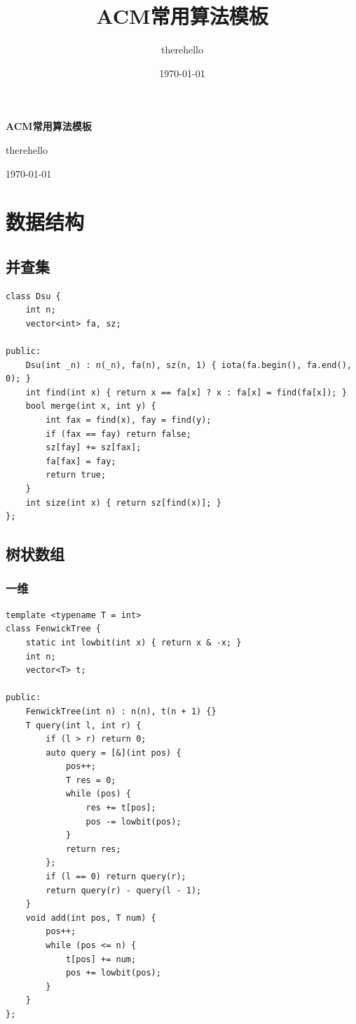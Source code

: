 \documentclass[UTF8, twoside]{ctexart}
\title{ACM常用算法模板}
\author{therehello}
\date{\today}
\newcommand\blankpage{
    \null
    \thispagestyle{empty}
    \addtocounter{page}{-1}
    \newpage
}
\begin{document}
\begin{sloppypar}

\begin{titlepage}
    \centering
    {\fontsize{40pt}{0pt}\selectfont \textbf{ACM常用算法模板}\par} %
    \vfill %
    {\fontsize{12pt}{0pt}\selectfont therehello\par} %
    \today %
\end{titlepage}

\blankpage

\tableofcontents

\clearpage

\section{数据结构}

\subsection{并查集}

\begin{lstlisting}[style=cpp]
class Dsu {
    int n;
    vector<int> fa, sz;

public:
    Dsu(int _n) : n(_n), fa(n), sz(n, 1) { iota(fa.begin(), fa.end(), 0); }
    int find(int x) { return x == fa[x] ? x : fa[x] = find(fa[x]); }
    bool merge(int x, int y) {
        int fax = find(x), fay = find(y);
        if (fax == fay) return false;
        sz[fay] += sz[fax];
        fa[fax] = fay;
        return true;
    }
    int size(int x) { return sz[find(x)]; }
};
\end{lstlisting}

\subsection{树状数组}

\subsubsection{一维}

\begin{lstlisting}[style=cpp]
template <typename T = int>
class FenwickTree {
    static int lowbit(int x) { return x & -x; }
    int n;
    vector<T> t;

public:
    FenwickTree(int n) : n(n), t(n + 1) {}
    T query(int l, int r) {
        if (l > r) return 0;
        auto query = [&](int pos) {
            pos++;
            T res = 0;
            while (pos) {
                res += t[pos];
                pos -= lowbit(pos);
            }
            return res;
        };
        if (l == 0) return query(r);
        return query(r) - query(l - 1);
    }
    void add(int pos, T num) {
        pos++;
        while (pos <= n) {
            t[pos] += num;
            pos += lowbit(pos);
        }
    }
};
\end{lstlisting}


\end{sloppypar}
\end{document}
